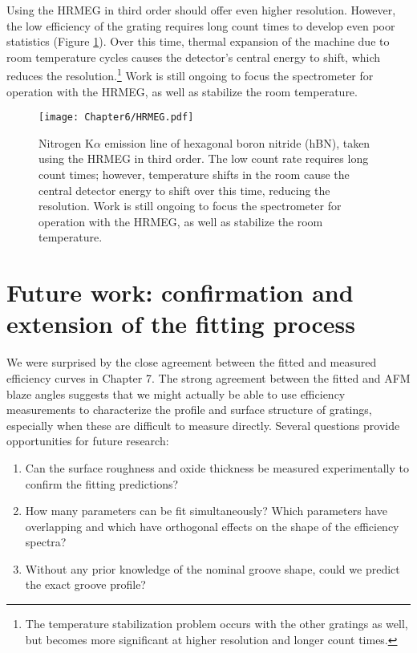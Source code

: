 Using the HRMEG in third order should offer even higher resolution.  However, the low efficiency of the grating requires long count times to develop even poor statistics (Figure \ref{hrmegXES}).  Over this time, thermal expansion of the machine due to room temperature cycles causes the detector's central energy to shift, which reduces the resolution.\footnote{The temperature stabilization problem occurs with the other gratings as well, but becomes more significant at higher resolution and longer count times.} Work is still ongoing to focus the spectrometer for operation with the HRMEG, as well as stabilize the room temperature.

\begin{figure}[htbp] %
   \centering
   \texttt{[image: Chapter6/HRMEG.pdf]} 
   \caption{Nitrogen K$\alpha$ emission line of hexagonal boron nitride (hBN), taken using the HRMEG in third order.  The low count rate requires long count times; however, temperature shifts in the room cause the central detector energy to shift over this time, reducing the resolution.  Work is still ongoing to focus the spectrometer for operation with the HRMEG, as well as stabilize the room temperature.}
   \label{hrmegXES}
\end{figure}

\section{Future work: confirmation and extension of the fitting process}
We were surprised by the close agreement between the fitted and measured efficiency curves in Chapter 7.  The strong agreement between the fitted and AFM blaze angles suggests that we might actually be able to use efficiency measurements to characterize the profile and surface structure of gratings, especially when these are difficult to measure directly.  Several questions provide opportunities for future research:
\begin{enumerate}
\item Can the surface roughness and oxide thickness be measured experimentally to confirm the fitting predictions?
\item How many parameters can be fit simultaneously? Which parameters have overlapping and which have orthogonal effects on the shape of the efficiency spectra?
\item Without any prior knowledge of the nominal groove shape, could we predict the exact groove profile?
\end{enumerate}

